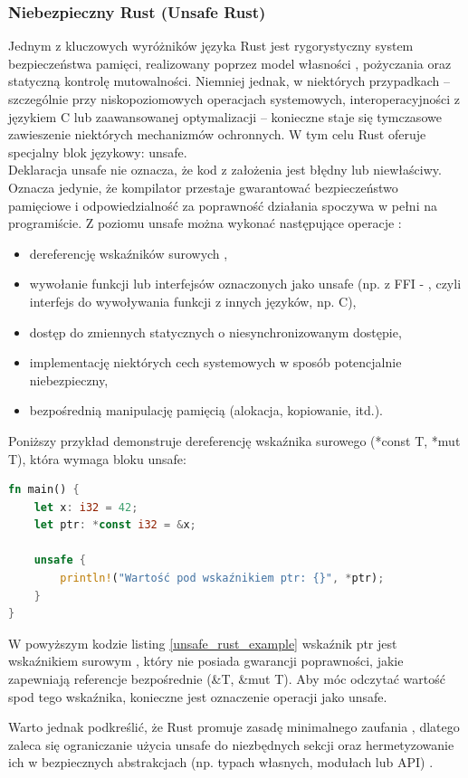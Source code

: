 \subsubsection{Niebezpieczny Rust (Unsafe Rust)}
Jednym z kluczowych wyróżników języka Rust jest rygorystyczny system bezpieczeństwa pamięci, realizowany poprzez model własności , pożyczania  oraz statyczną kontrolę mutowalności. Niemniej jednak, w niektórych przypadkach – szczególnie przy niskopoziomowych operacjach systemowych, interoperacyjności z językiem C lub zaawansowanej optymalizacji – konieczne staje się tymczasowe zawieszenie niektórych mechanizmów ochronnych. W tym celu Rust oferuje specjalny blok językowy: unsafe. \\
Deklaracja unsafe nie oznacza, że kod z założenia jest błędny lub niewłaściwy. Oznacza jedynie, że kompilator przestaje gwarantować bezpieczeństwo pamięciowe i odpowiedzialność za poprawność działania spoczywa w pełni na programiście. Z poziomu unsafe można wykonać następujące operacje \cite{UnsafeRust} :
\begin{itemize}
\item dereferencję wskaźników surowych ,
\item wywołanie funkcji lub interfejsów oznaczonych jako unsafe (np. z FFI - , czyli interfejs do wywoływania funkcji z innych języków, np. C),
\item dostęp do zmiennych statycznych o niesynchronizowanym dostępie,
\item implementację niektórych cech  systemowych w sposób potencjalnie niebezpieczny,
\item bezpośrednią manipulację pamięcią (alokacja, kopiowanie, itd.).
\end{itemize} 
Poniższy przykład demonstruje dereferencję wskaźnika surowego (*const T, *mut T), która wymaga bloku unsafe:
\begin{lstlisting}[language=Rust, caption=Przykład użycia unsafe Rust, label=unsafe_rust_example]
fn main() {
    let x: i32 = 42;
    let ptr: *const i32 = &x;

    unsafe {
        println!("Wartość pod wskaźnikiem ptr: {}", *ptr);
    }
}
\end{lstlisting}
W powyższym kodzie listing \ref{unsafe_rust_example} wskaźnik ptr jest wskaźnikiem surowym , który nie posiada gwarancji poprawności, jakie zapewniają referencje bezpośrednie (\&T, \&mut T). Aby móc odczytać wartość spod tego wskaźnika, konieczne jest oznaczenie operacji jako unsafe.

Warto jednak podkreślić, że Rust promuje zasadę minimalnego zaufania , dlatego zaleca się ograniczanie użycia unsafe do niezbędnych sekcji oraz hermetyzowanie ich w bezpiecznych abstrakcjach (np. typach własnych, modułach lub API) \cite{UnsafeRust}.




